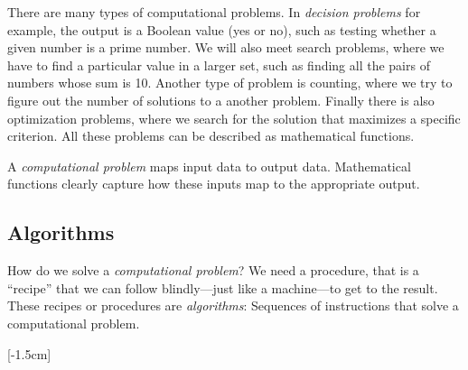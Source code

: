 \documentclass{aldast}
\begin{document}
There are many types of computational problems. In \emph{decision
  problems} for example, the output is a Boolean value (yes or no),
such as testing whether a given number is a prime number. We will also
meet search problems, where we have to find a particular value in a
larger set, such as finding all the pairs of numbers whose sum is
10. Another type of problem is counting, where we try to figure out
the number of solutions to a another problem. Finally there is also
optimization problems, where we search for the solution that maximizes
a specific criterion. All these problems can be described as
mathematical functions.

\begin{takeaway}
  A \emph{computational problem} maps input data to output
  data. Mathematical functions clearly capture how these inputs map to
  the appropriate output.
\end{takeaway}

\subsection{Algorithms}

How do we solve a \emph{computational problem}? We need a procedure,
that is a ``recipe'' that we can follow blindly---just like a
machine---to get to the result. These recipes or procedures are
\emph{algorithms}: Sequences of instructions that solve a
computational problem.

[-1.5cm]
\end{document}
